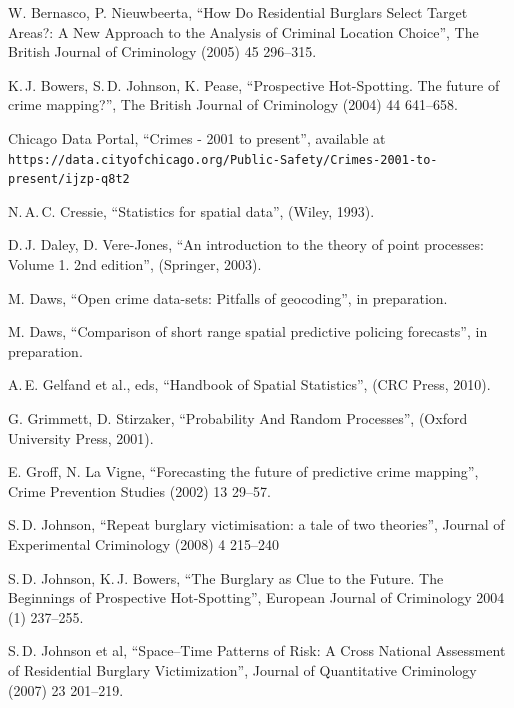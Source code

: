 \documentclass[twoside,a4paper]{article}
\theoremstyle{plain}
\theoremstyle{definition}
\begin{document}
\begin{thebibliography}{99}

 W. Bernasco, P. Nieuwbeerta,
	``How Do Residential Burglars Select Target Areas?: A New Approach to the Analysis of Criminal Location Choice'',
	The British Journal of Criminology (2005) 45 296--315.

 K.\,J. Bowers, S.\,D. Johnson, K. Pease,
	``Prospective Hot-Spotting.  The future of crime mapping?'',
	The British Journal of Criminology (2004) 44 641--658.

 Chicago Data Portal, ``Crimes - 2001 to present'', available at
   \texttt{https://data.cityofchicago.org/Public-Safety/Crimes-2001-to-present/ijzp-q8t2}

 N.\,A.\,C. Cressie,
	``Statistics for spatial data'',
	(Wiley, 1993).

 D.\,J. Daley, D. Vere-Jones,
	``An introduction to the theory of point processes: Volume 1. 2nd edition'',
	(Springer, 2003).

 M. Daws, ``Open crime data-sets: Pitfalls of geocoding'',
	in preparation.

 M. Daws, ``Comparison of short range spatial predictive policing forecasts'',
	in preparation.


 A.\,E. Gelfand et al., eds,
	``Handbook of Spatial Statistics'',
	(CRC Press, 2010).

 G. Grimmett, D. Stirzaker, ``Probability And Random Processes'',
     (Oxford University Press, 2001).

 E. Groff, N. La Vigne,
	``Forecasting the future of predictive crime mapping'',
    Crime Prevention Studies (2002) 13 29--57.

 S.\,D. Johnson,
	``Repeat burglary victimisation: a tale of two theories'',
	Journal of Experimental Criminology (2008) 4 215--240
	
 S.\,D. Johnson, K.\,J. Bowers,
	``The Burglary as Clue to the Future. The Beginnings of Prospective Hot-Spotting'',
	European Journal of Criminology 2004 (1) 237--255.
	
 S.\,D. Johnson et al,
	``Space--Time Patterns of Risk: A Cross National Assessment of
	Residential Burglary Victimization'',
	Journal of Quantitative Criminology (2007) 23 201--219.
	

\end{thebibliography}
\end{document}
